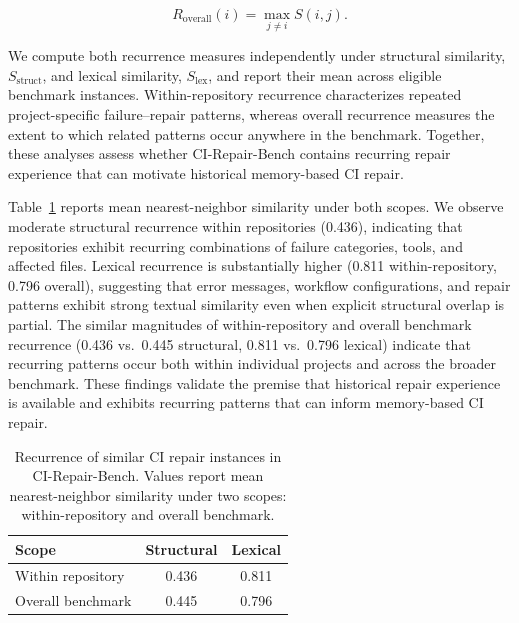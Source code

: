 \begin{equation}
R_{\mathrm{overall}}(i)
=
\max_{j \neq i} S(i,j).
\end{equation}

We compute both recurrence measures independently under structural
similarity, $S_{\mathrm{struct}}$, and lexical similarity,
$S_{\mathrm{lex}}$, and report their mean across eligible benchmark
instances. Within-repository recurrence characterizes repeated
project-specific failure--repair patterns, whereas overall recurrence
measures the extent to which related patterns occur anywhere in the
benchmark. Together, these analyses assess whether CI-Repair-Bench
contains recurring repair experience that can motivate historical
memory-based CI repair.


Table~\ref{tab:benchmark_recurrence} reports mean nearest-neighbor
similarity under both scopes. We observe moderate structural recurrence
within repositories (0.436), indicating that repositories exhibit
recurring combinations of failure categories, tools, and affected files.
Lexical recurrence is substantially higher (0.811 within-repository,
0.796 overall), suggesting that error messages, workflow configurations,
and repair patterns exhibit strong textual similarity even when explicit
structural overlap is partial. The similar magnitudes of within-repository
and overall benchmark recurrence (0.436 vs.\ 0.445 structural, 0.811 vs.\
0.796 lexical) indicate that recurring patterns occur both within individual
projects and across the broader benchmark. These findings validate the
premise that historical repair experience is available and exhibits
recurring patterns that can inform memory-based CI repair.


\begin{table}[t]
\caption{Recurrence of similar CI repair instances in CI-Repair-Bench.
         Values report mean nearest-neighbor similarity under two scopes:
         within-repository and overall benchmark.}
\label{tab:benchmark_recurrence}
\centering
\begin{tabular}{lcc}
\hline
\textbf{Scope} &
\textbf{Structural} &
\textbf{Lexical} \\
\hline
Within repository  & 0.436 & 0.811 \\
Overall benchmark  & 0.445 & 0.796 \\
\hline
\end{tabular}
\end{table}


